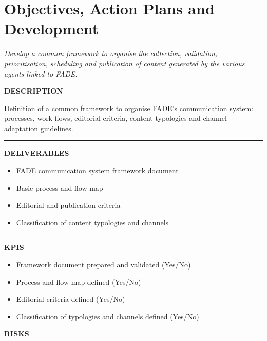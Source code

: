 \documentclass[11pt,a4paper]{scrreprt}
\newcommand{\fieldlabel}[1]{%
  {\footnotesize\sffamily\bfseries\color{mutedcolor}\MakeUppercase{#1}}\par\nopagebreak[4]
}
\newcommand{\fieldsep}{\vspace{3pt}\noindent\textcolor{bordercolor}{\rule{\linewidth}{0.4pt}}\vspace{3pt}\par}
\begin{document}
\section{Objectives, Action Plans and Development}
{\small\color{mutedcolor}\itshape Develop a common framework to organise the collection, validation, prioritisation, scheduling and publication of content generated by the various agents linked to FADE.}\par\vspace{6pt}

\begin{tcolorbox}[pabox={comcolor}{A.P.1.1 \enspace\textbullet\enspace Definition of the Process, Flow and Criteria Model for the Communication System}]

\fieldlabel{Description}
{\small Definition of a common framework to organise FADE's communication system: processes, work flows, editorial criteria, content typologies and channel adaptation guidelines.}\par
\fieldsep
\fieldlabel{Deliverables}
{\small \begin{itemize}[noitemsep,topsep=2pt]
\item FADE communication system framework document
\item Basic process and flow map
\item Editorial and publication criteria
\item Classification of content typologies and channels
\end{itemize}}\par
\fieldsep
\fieldlabel{KPIs}
{\small \begin{itemize}[noitemsep,topsep=2pt]
\item Framework document prepared and validated (Yes/No)
\item Process and flow map defined (Yes/No)
\item Editorial criteria defined (Yes/No)
\item Classification of typologies and channels defined (Yes/No)
\end{itemize}}\par
\end{tcolorbox}
\begin{tcolorbox}[riskbox]
{\footnotesize\sffamily\bfseries\color{red!50!black} RISKS}\par{}
\end{tcolorbox}
\end{document}
